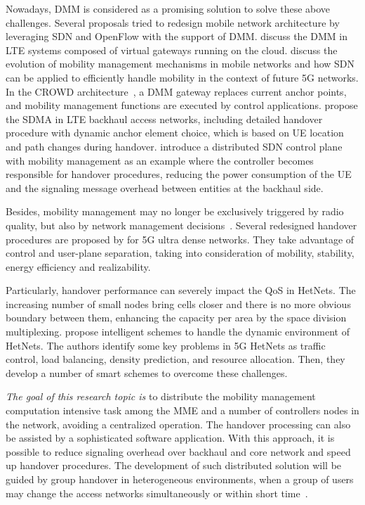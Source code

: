 Nowadays, \acf{DMM} is considered as a promising solution to solve these above
challenges. Several proposals tried to redesign mobile network architecture by
leveraging \ac{SDN} and OpenFlow with the support of \ac{DMM}.
\citet{Karimzadeh2014} discuss the \ac{DMM} in \ac{LTE} systems composed of
virtual gateways running on the cloud. \citet{Kuklinski2014b} discuss the
evolution of mobility management mechanisms in mobile networks and how \ac{SDN}
can be applied to efficiently handle mobility in the context of future 5G
networks. In the CROWD architecture~\cite{Ahmad2013a}, a \ac{DMM} gateway
replaces current anchor points, and mobility management functions are executed
by control applications. \citet{Gurusanthosh2013} propose the \acf{SDMA} in
\ac{LTE} backhaul access networks, including detailed handover procedure with
dynamic anchor element choice, which is based on \ac{UE} location and path
changes during handover. \citet{Mahmoodi2014} introduce a distributed \ac{SDN}
control plane with mobility management as an example where the controller
becomes responsible for handover procedures, reducing the power consumption of
the \ac{UE} and the signaling message overhead between entities at the backhaul
side.

Besides, mobility management may no longer be exclusively triggered by radio
quality, but also by network management decisions~\cite{Rost2014}. Several
redesigned handover procedures are proposed by \citet{Zhang2015b} for 5G ultra
dense networks. They take advantage of control and user-plane separation,
taking into consideration of mobility, stability, energy efficiency and
realizability.

Particularly, handover performance can severely impact the \ac{QoS} in
\acp{HetNet}. The increasing number of small nodes bring cells closer and there
is no more obvious boundary between them, enhancing the capacity per area by
the space division multiplexing. \citet{Sun2015} propose intelligent schemes
to handle the dynamic environment of \acp{HetNet}. The authors identify some
key problems in 5G \acp{HetNet} as traffic control, load balancing, density
prediction, and resource allocation. Then, they develop a number of smart
schemes to overcome these challenges.

\emph{The goal of this research topic is} to distribute the mobility management
computation intensive task among the \ac{MME} and a number of controllers nodes
in the network, avoiding a centralized operation. The handover processing can
also be assisted by a sophisticated software application. With this approach,
it is possible to reduce signaling overhead over backhaul and core network and
speed up handover procedures. The development of such distributed solution will
be guided by group handover in heterogeneous environments, when a group of
users may change the access networks simultaneously or within short
time~\cite{Chowdhury2012}.

